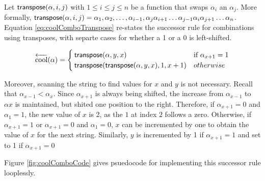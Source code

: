  Let $\mathsf{transpose(} \alpha, i, j \mathsf{)}$ with $1 \le i \le j \le n$ be a function that swaps $\alpha_i$ an $\alpha_j$.  More formally, $\mathsf{transpose(} \alpha, i, j \mathsf{)}=\alpha_1,\alpha_2,\dots,\alpha_{i-1},\alpha_{j}\alpha_{i+1}\dots \alpha_{j-1}\alpha_i \alpha_{j+1}\dots \alpha_n$.  Equation \eqref{eq:coolComboTranspose} re-states the successor rule for combinations using transposes, with separte cases for whether a 1 or a 0 is left-shifted.

\begin{equation}\label{eq:coolComboTranspose}
    \overleftarrow{\text{cool}}(\alpha) = \begin{cases}
	\mathsf{transpose(} \alpha, y, x \mathsf{)} & \text{if $\alpha_{x+1}=1$}\\
	\mathsf{transpose(} \mathsf{transpose(} \alpha, y, x \mathsf{)}, 1, x+1 \mathsf{)} & otherwise\\
\end{cases}
\end{equation}

Moreover, scanning the string to find values for $x$ and $y$ is not necessary.  Recall that $\alpha_{x-1} < \alpha_{x}$.  Since $\alpha_{x+1}$ is always being shifted, the increase from $\alpha_{x-1}$ to $\alpha{x}$ is maintained, but shited one position to the right.  Therefore, if $\alpha_{x+1}=0$ and $\alpha_{1}=1$, the new value of $x$ is 2, as the $1$ at index $2$ follows a zero.  Otherwise, if $\alpha_{x+1}=1$ or $\alpha_{x+1}=0$ and $\alpha_{1}=0$, $x$ can be incremented by one to obtain the value of $x$ for the next string.  Similarly, $y$ is incremented by 1 if $\alpha_{x+1}=1$ and set to 1 if $\alpha_{x+1}=0$

Figure \ref{fig:coolComboCode} gives psuedocode for implementing this successor rule looplessly.

